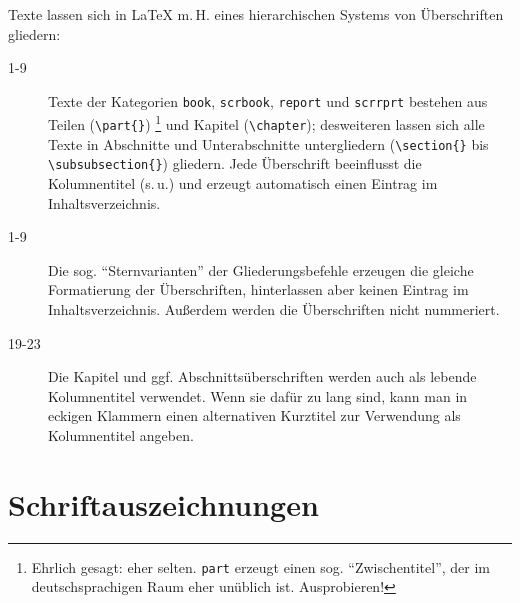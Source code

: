 Texte lassen sich in \LaTeX{} m.\,H. eines hierarchischen Systems von Überschriften gliedern:

\begin{description}
 \item[1-9] Texte der Kategorien 
    \lstinline/book/, 
    \lstinline/scrbook/, 
    \lstinline/report/ und 
    \lstinline/scrrprt/ 
 bestehen aus Teilen (\lstinline/\part{}/)
 \footnote{Ehrlich gesagt: eher selten. 
 \lstinline/part/ 
 erzeugt einen sog. \enquote{Zwischentitel},
 der im deutschsprachigen Raum eher unüblich ist. Ausprobieren! }
 und Kapitel (\lstinline/\chapter/);
 desweiteren lassen sich alle Texte in Abschnitte und Unterabschnitte untergliedern 
 (\lstinline/\section{}/ bis \lstinline/\subsubsection{}/) 
 gliedern.
 Jede Überschrift beeinflusst die Kolumnentitel (s.\,u.) und erzeugt automatisch einen Eintrag
 im Inhaltsverzeichnis.
 \item[1-9] Die sog. \enquote{Sternvarianten} der Gliederungsbefehle erzeugen die gleiche
 Formatierung der Überschriften, hinterlassen aber keinen Eintrag im Inhaltsverzeichnis.
 Außerdem werden die Überschriften nicht nummeriert.
 \item[19-23] Die Kapitel und ggf. Abschnittsüberschriften werden auch als lebende Kolumnentitel
 verwendet. Wenn sie dafür zu lang sind, kann man in eckigen Klammern einen alternativen
 Kurztitel zur Verwendung als Kolumnentitel angeben. 
\end{description}



\section{Schriftauszeichnungen}


